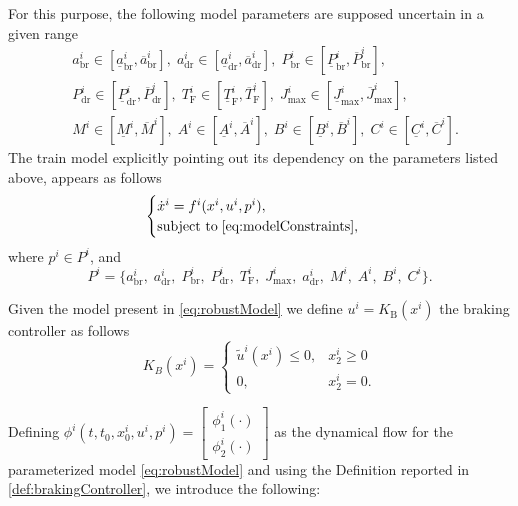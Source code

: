For this purpose, the following model parameters are supposed uncertain in a given range
%
\begin{subequations}
	\begin{align*}
		&a_{\mathrm{br}}^i \in [\underline{a}_{\mathrm{br}}^i , \overline{a}_{\mathrm{br}}^i], \;
		a_{\mathrm{dr}}^i \in [\underline{a}_{\mathrm{dr}}^i , \overline{a}_{\mathrm{dr}}^i],  \;
		P^i_{\mathrm{br}} \in [\underline{P}_{\mathrm{br}}^i , \overline{P}_{\mathrm{br}}^i]  , \\
		&P^i_{\mathrm{dr}} \in [\underline{P}_{\mathrm{dr}}^i , \overline{P}_{\mathrm{dr}}^i],   \;
		T_\mathrm{F}^i \in [\underline{T}_\mathrm{F}^i , \overline{T}_\mathrm{F}^i] ,  \;
		J_\mathrm{max}^i \in [\underline{J}_\mathrm{max}^i , \overline{J}_\mathrm{max}^i] , \\
		&M^i \in [\underline{M}^i , \overline{M}^i], \;
		A^i \in [\underline{A}^i , \overline{A}^i] ,  \;
		B^i \in [\underline{B}^i , \overline{B}^i] , \;
		C^i \in [\underline{C}^i , \overline{C}^i].
	\end{align*}
\end{subequations}
%
The train model explicitly pointing out its dependency on the parameters listed above, appears as follows
%
\begin{equation}   \label{eq:robustModel}  
	\begin{cases}
		\dot{x}^i = f^i(x^i,u^i,p^i),  \\ 
		\text{subject to} \; \eqref{eq:modelConstraints} ,
	\end{cases}
\end{equation}
where $p^i \in P^i$, and
\begin{equation*}
	P^i = \{a_{\mathrm{br}}^i,\;  a_{\mathrm{dr}}^i,\;P^i_{\mathrm{br}},\;P^i_{\mathrm{dr}},\;T_\mathrm{F}^i,\;  J_\mathrm{max}^i,\;a_{\mathrm{dr}}^i,\;M^i,\;A^i ,\; B^i, \; C^i \}.
\end{equation*}
%
\begin{definition} \label{def:brakingController}
	Given the model present in \eqref{eq:robustModel} we define  $u^i= K_\mathrm{B}(x^i)$ the braking controller as follows
	\begin{equation*}
		K_B(x^i)=
		\begin{cases}
			\tilde{u}^i(x^i) \leq 0,& x_2^i \geq 0\\
			0 ,& x_2^i = 0.
		\end{cases}     
	\end{equation*}
\end{definition}
Defining $\phi^i(t,t_0,x_0^i,u^i,p^i)= \left [\begin{array}{c}
	\phi^i_1\left(\cdot \right) \\
	\phi^i_2\left(\cdot \right)
\end{array}\right ]$ as the dynamical flow for the parameterized model \eqref{eq:robustModel} and using the Definition reported in \ref{def:brakingController}, we introduce the following:
